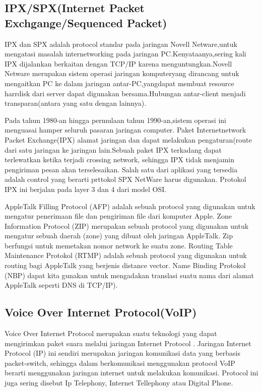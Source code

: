 \subsection{IPX/SPX(Internet Packet Exchgange/Sequenced Packet)}  
IPX dan SPX adalah protocol standar pada jaringan Novell Netware,untuk mengatasi masalah internetworking pada jaringan 
PC.Kenyataanya,sering kali IPX dijalankan berkaitan dengan TCP/IP karena menguntungkan.Novell Netware merupakan sistem operasi jaringan 
komputeryang dirancang untuk mengaitkan PC ke dalam jaringan antar-PC,yangdapat membuat resource harrdisk dari server dapat digunakan 
bersama.Hubungan antar-client menjadi transparan(antara yang satu dengan lainnya).

Pada tahun 1980-an hingga permulaan tahun 1990-an,sistem operasi ini menguasai hamper seluruh pasaran jaringan computer.
Paket Internetnetwork Packet Exchange(IPX) alamat jaringan dan dapat melakukan pengaturan(route dari satu jaringan ke jaringan 
lain.Sebuah paket IPX terkadang dapat terlewatkan ketika terjadi crossing network, sehingga IPX tidak menjamin pengiriman pesan akan 
terselesaikan. Salah satu dari aplikasi yang tersedia adalah control yang berarti prttokol SPX NetWare harus digunakan. Protokol IPX ini 
berjalan pada layer 3 dan 4 dari model OSI.

AppleTalk Filling Protocol (AFP) adalah sebuah protocol yang digunakan untuk mengatur penerimaan file dan pengiriman file dari komputer 
Apple.
Zone Information Protocol (ZIP) merupakan sebuah  protocol yang digunakan  untuk mengatur sebuah  daerah (zone) yang dibuat  oleh 
jaringan AppleTalk. Zip berfungsi untuk memetakan nomor network ke suatu zone.
Routing Table Maintenance Protokol (RTMP) adalah sebuah  protocol yang digunakan untuk  routing bagi AppleTalk yang berjenis distance 
vector.
Name Binding Protokol (NBP) dapat kita gunakan untuk mengadakan translasi suatu nama dari alamat AppleTalk seperti DNS di TCP/IP).

\subsection{Voice Over Internet Protocol(VoIP)}
Voice Over Internet Protocol merupakan suatu teknologi yang dapat mengirimkan paket suara melalui jaringan Internet Protocol . Jaringan 
Internet Protocol (IP) ini  sendiri merupakan jaringan komunikasi data yang berbasis packet-switch, sehingga dalam berkomunikasi 
menggunakan protocol VoIP berarti menggunakan jaringan internet untuk melakukan komunikasi. Protocol ini juga sering disebut Ip 
Telephony, Internet Tellephony atau Digital Phone.

